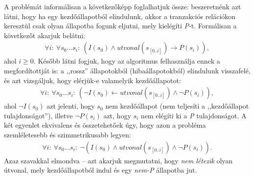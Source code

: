 A problémát informálisan a következőképp foglalhatjuk össze: beszeretnénk azt látni, hogy ha egy kezdőállapotból elindulunk, akkor a tranzakciós relációkon keresztül csak olyan állapotba fogunk eljutni, mely kielégíti \emph{P}-t. Formálisan a következőt akarjuk belátni:
\begin{align}
	\forall i:~\forall s_{0} \dots s_{i}:~(I(s_{0}) \wedge \mathit{utvonal}(s_{[0..i]}) \rightarrow P(s_{i})),
\end{align}
ahol $i \geq 0$. Később látni fogjuk, hogy az algoritmus felhasználja ennek a megfordítottját is: a ,,rossz'' állapotokból (hibaállapotokból) elindulunk visszafelé, és azt vizsgáljuk, hogy elérjük-e valamelyik kezdőállapotot:
\begin{align}
	\forall i:~\forall s_{0} \dots s_{i}:~(\neg I(s_{0}) \leftarrow \mathit{utvonal}(s_{[0..i]}) \wedge \neg P(s_{i})),
\end{align}
ahol $\neg I(s_{0})$ azt jelenti, hogy $s_{0}$ nem kezdőállapot (nem teljesíti a ,,kezdőállapot tulajdonságot''), illetve $\neg P(s_{i})$ azt, hogy $s_{i}$ nem elégíti ki a \emph{P} tulajdonságot. A két egyenlet ekvivalens és összetehetőek úgy, hogy azon a probléma szemléletesebb és szimmetrikusabb legyen:
\begin{align}
	\forall i:~\forall s_{0} \dots s_{i}:~\neg(I(s_{0}) \wedge \mathit{utvonal}(s_{[0..i]}) \wedge \neg P(s_{i})).
\end{align}
Azaz szavakkal elmondva -- azt akarjuk megmutatni, hogy \emph{nem létezik} olyan útvonal, mely kezdőállapotból indul és egy \emph{nem-P} állapotba jut.
